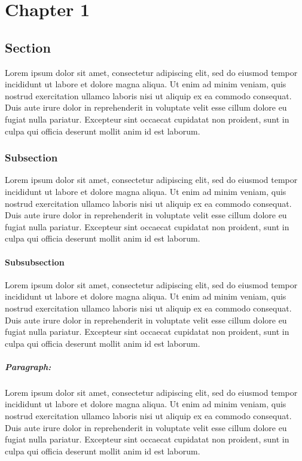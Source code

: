 % 
\chapter[Chapter 1]{Chapter 1} 

\section{Section}
Lorem ipsum dolor sit amet, consectetur adipiscing elit, sed do eiusmod tempor incididunt ut labore et dolore magna aliqua. Ut enim ad minim veniam, quis nostrud exercitation ullamco laboris nisi ut aliquip ex ea commodo consequat. Duis aute irure dolor in reprehenderit in voluptate velit esse cillum dolore eu fugiat nulla pariatur. Excepteur sint occaecat cupidatat non proident, sunt in culpa qui officia deserunt mollit anim id est laborum.

\subsection{Subsection}
Lorem ipsum dolor sit amet, consectetur adipiscing elit, sed do eiusmod tempor incididunt ut labore et dolore magna aliqua. Ut enim ad minim veniam, quis nostrud exercitation ullamco laboris nisi ut aliquip ex ea commodo consequat. Duis aute irure dolor in reprehenderit in voluptate velit esse cillum dolore eu fugiat nulla pariatur. Excepteur sint occaecat cupidatat non proident, sunt in culpa qui officia deserunt mollit anim id est laborum.

\subsubsection{Subsubsection}
Lorem ipsum dolor sit amet, consectetur adipiscing elit, sed do eiusmod tempor incididunt ut labore et dolore magna aliqua. Ut enim ad minim veniam, quis nostrud exercitation ullamco laboris nisi ut aliquip ex ea commodo consequat. Duis aute irure dolor in reprehenderit in voluptate velit esse cillum dolore eu fugiat nulla pariatur. Excepteur sint occaecat cupidatat non proident, sunt in culpa qui officia deserunt mollit anim id est laborum.

\paragraph{Paragraph: }
Lorem ipsum dolor sit amet, consectetur adipiscing elit, sed do eiusmod tempor incididunt ut labore et dolore magna aliqua. Ut enim ad minim veniam, quis nostrud exercitation ullamco laboris nisi ut aliquip ex ea commodo consequat. Duis aute irure dolor in reprehenderit in voluptate velit esse cillum dolore eu fugiat nulla pariatur. Excepteur sint occaecat cupidatat non proident, sunt in culpa qui officia deserunt mollit anim id est laborum.

